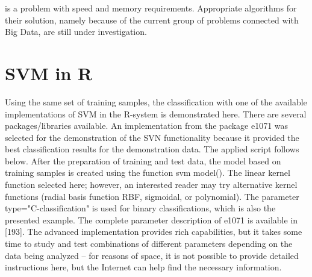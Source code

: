 \documentclass[11pt,openany,executivepaper]{book}
\begin{document}
is a problem with speed and memory requirements. Appropriate algorithms for
their solution, namely because of the current group of problems connected with
Big Data, are still under investigation.

\section{SVM in R}

Using the same set of training samples, the classification with one of the available implementations of SVM in the R-system is demonstrated here. There are
several packages/libraries available. An implementation from the package e1071
was selected for the demonstration of the SVN functionality because it provided
the best classification results for the demonstration data. The applied script follows below. After the preparation of training and test data, the model based on
training samples is created using the function svm model(). The linear kernel
function selected here; however, an interested reader may try alternative kernel
functions (radial basis function RBF, sigmoidal, or polynomial). The parameter
type="C-classification" is used for binary classifications, which is also the
presented example. The complete parameter description of e1071 is available
in [193].
The advanced implementation provides rich capabilities, but it takes some
time to study and test combinations of different parameters depending on the
data being analyzed – for reasons of space, it is not possible to provide detailed
instructions here, but the Internet can help find the necessary information.
\end{document}
